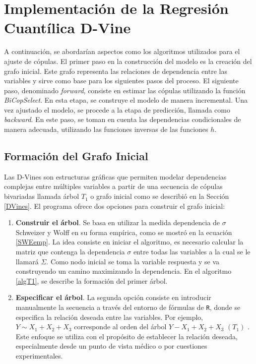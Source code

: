 \section{Implementación de la Regresión Cuantílica D-Vine}

A continuación, se abordarían aspectos como los algoritmos utilizados para el ajuste de cópulas. El primer paso en la construcción del modelo es la creación del grafo inicial. Este grafo representa las relaciones de dependencia entre las variables y sirve como base para los siguientes pasos del proceso. El siguiente paso, denominado \textit{forward}, consiste en estimar las cópulas utilizando la función \textit{BiCopSelect}. En esta etapa, se construye el modelo de manera incremental. Una vez ajustado el modelo, se procede a la etapa de predicción, llamada como \textit{backward}. En este paso, se toman en cuenta las dependencias condicionales de manera adecuada, utilizando las funciones inversas de las funciones $h$.

\vspace{-0.5cm}
\subsection{Formación del Grafo Inicial}

Las D-Vines son estructuras gráficas que permiten modelar dependencias complejas entre múltiples variables a partir de una secuencia de cópulas bivariadas llamada árbol $T_1$ o grafo inicial como se describió en la Sección \ref{DVines}. El programa ofrece dos opciones para construir el grafo inicial:

\begin{enumerate}
    \item \textbf{Construir el árbol}. Se basa en utilizar la medida dependencia de $\sigma$ Schweizer y Wolff en su forma empírica, como se mostró en la ecuación \eqref{SWEemp}. La idea consiste en iniciar el algoritmo, es necesario calcular la matriz que contenga la dependencia $\sigma$ entre todas las variables a la cual se le llamará $\Sigma$. Como nodo inicial se toma la variable respuesta y se va construyendo un camino maximizando la dependencia. En el algoritmo \ref{algT1}, se describe la formación del primer árbol.

    \item \textbf{Especificar el árbol}. La segunda opción consiste en introducir manualmente la secuencia a través del entorno de fórmulas de \texttt{R}, donde se especifica la relación deseada entre las variables. Por ejemplo, $Y \sim X_1 + X_2 + X_3$ corresponde al orden del árbol $Y - X_1 + X_2 + X_3$ $(T_1)$ . Este enfoque se utiliza con el propósito de establecer la relación deseada, especialmente desde un punto de vista médico o  por cuestiones experimentales.
\end{enumerate}

